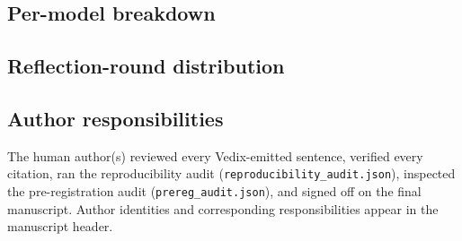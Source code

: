 \subsection*{Per-model breakdown}

\begin{itemize}
\VEDIXMODELSTABLE
\end{itemize}

\subsection*{Reflection-round distribution}

\begin{itemize}
\VEDIXROUNDSTABLE
\end{itemize}

\subsection*{Author responsibilities}

The human author(s) reviewed every Vedix-emitted sentence, verified
every citation, ran the reproducibility audit
(\texttt{reproducibility\_audit.json}), inspected the pre-registration
audit (\texttt{prereg\_audit.json}), and signed off on the final
manuscript. Author identities and corresponding responsibilities appear
in the manuscript header.

